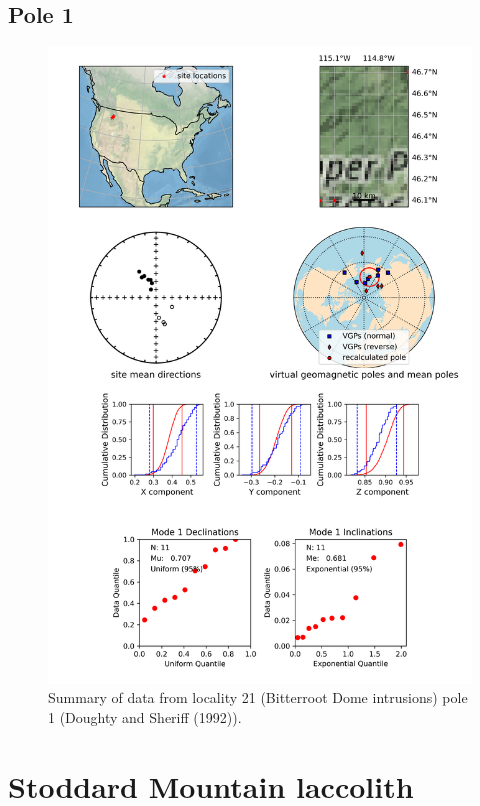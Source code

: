 \subsection{Pole 1}


\begin{figure}[H]
\centering
\includegraphics[width=5 in]{./21/1/pole_summary.png}
\caption{Summary of data from locality 21 (Bitterroot Dome intrusions) pole 1 (Doughty and Sheriff (1992)).}
\end{figure}

\section{Stoddard Mountain laccolith}
